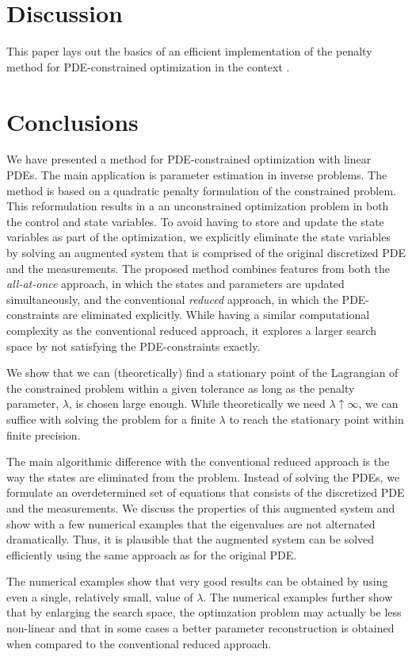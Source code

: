 \documentclass{iopart}
\begin{document}
\section{Discussion}
\label{discussion}
This paper lays out the basics of an efficient implementation of the
penalty method for PDE-constrained optimization in the context . 

\section{Conclusions}
\label{conclusion}
We have presented a method for PDE-constrained optimization with linear PDEs. The main application
is parameter estimation in inverse problems.
The method is based on a quadratic penalty formulation of the constrained problem. This reformulation
results in a an unconstrained optimization problem in both the control and state variables.
To avoid having to store and update the state variables as part of the optimization, we explicitly eliminate
the state variables by solving an augmented system that is comprised of the original discretized PDE and the measurements. 
The proposed method combines features from both the \emph{all-at-once}
approach, in which the states and parameters are updated simultaneously, and
the conventional \emph{reduced} approach, in which the PDE-constraints are eliminated explicitly.
While having a similar computational complexity as the conventional reduced approach, it explores
a larger search space by not satisfying the PDE-constraints exactly. 

We show that we can (theoretically)
find a stationary point of the Lagrangian of the constrained problem within a given tolerance as long as the penalty parameter, $\lambda$,
is chosen large enough. While theoretically we need $\lambda \uparrow \infty$, we can suffice with solving the problem
for a finite $\lambda$ to reach the stationary point within finite precision. 

The main algorithmic difference with the conventional reduced approach is the way the states are eliminated from the problem.
Instead of solving the PDEs, we formulate an overdetermined set of equations that consists of the discretized PDE and the measurements.
We discuss the properties of this augmented system and show with a few numerical examples that the eigenvalues are not alternated dramatically.
Thus, it is plausible that the augmented system can be solved efficiently using the same approach as for the original PDE.

The numerical examples show that
very good results can be obtained by using even a single, relatively small, value of $\lambda$.
The numerical examples further show that by enlarging the search space, the optimzation problem
may actually be less non-linear and that in some cases a better parameter reconstruction 
is obtained when compared to the conventional reduced approach.
\end{document}
